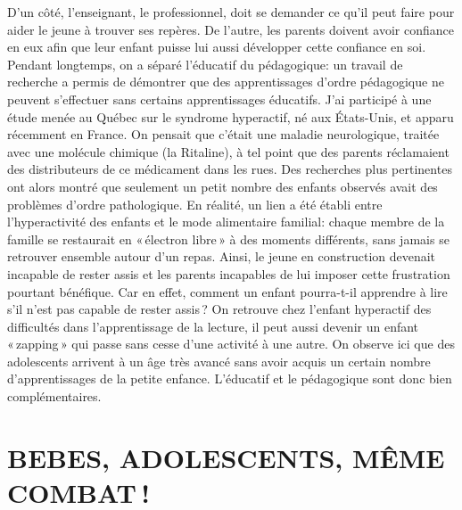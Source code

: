 \documentclass[11pt]{article} %
\begin{document}
  D'un côté, l'enseignant, le professionnel, doit se demander ce qu'il peut faire pour aider le jeune à trouver ses repères.\newline
  De l'autre, les parents doivent avoir confiance en eux afin que leur enfant puisse lui aussi développer cette confiance en soi.\newline
  Pendant longtemps, on a séparé l'éducatif du pédagogique: un travail de recherche a permis de démontrer que des apprentissages d'ordre pédagogique ne peuvent s'effectuer sans certains apprentissages éducatifs.\newline
  J'ai participé à une étude menée au Québec sur le syndrome hyperactif, né aux États-Unis, et apparu récemment en France. On pensait que c'était une maladie neurologique, traitée avec une molécule chimique (la Ritaline), à tel point que des parents réclamaient des distributeurs de ce médicament dans les rues. Des recherches plus pertinentes ont alors montré que seulement un petit nombre des enfants observés avait des problèmes d'ordre pathologique.\newline
  En réalité, un lien a été établi entre l'hyperactivité des enfants et le mode alimentaire familial: chaque membre de la famille se restaurait en « électron libre » à des moments différents, sans jamais se retrouver ensemble autour d'un repas. Ainsi, le jeune en construction devenait incapable de rester assis et les parents incapables de lui imposer cette frustration pourtant bénéfique.\newline
  Car en effet, comment un enfant pourra-t-il apprendre à lire s'il n'est pas capable de rester assis ? On retrouve chez l'enfant hyperactif des difficultés dans l'apprentissage de la lecture, il peut aussi devenir un enfant « zapping » qui passe sans cesse d'une activité à une autre.\newline
  On observe ici que des adolescents arrivent à un âge très avancé sans avoir acquis un certain nombre d'apprentissages de la petite enfance. L'éducatif et le pédagogique sont donc bien complémentaires.


\section{BEBES, ADOLESCENTS, MÊME COMBAT !}
\end{document}
